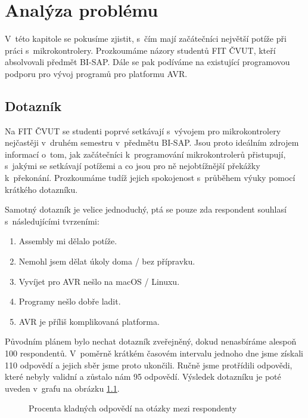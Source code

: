 \chapter{Analýza problému}

V~této kapitole se pokusíme zjistit, s~čím mají začátečníci největší potíže při práci s~mikrokontrolery. Prozkoumáme názory studentů FIT ČVUT, kteří absolvovali předmět BI-SAP. Dále se pak podíváme na existující programovou podporu pro vývoj programů pro platformu AVR.

\section{Dotazník}

Na FIT ČVUT se studenti poprvé setkávají s~vývojem pro mikrokontrolery nejčastěji v~druhém semestru v~předmětu BI-SAP. Jsou proto ideálním zdrojem informací o~tom, jak začátečníci k~programování mikrokontrolerů přistupují, s~jakými se setkávají potížemi a co jsou pro ně nejobtížnější pře\-káž\-ky k~překonání. Prozkoumáme tudíž jejich spokojenost s~průběhem výuky pomocí krátkého dotazníku.

Samotný dotazník je velice jednoduchý, ptá se pouze zda respondent souhlasí s~následujícími tvrzeními:

\begin{enumerate}
	\item Assembly mi dělalo potíže.
	\item Nemohl jsem dělat úkoly doma / bez přípravku.
	\item Vyvíjet pro AVR nešlo na macOS / Linuxu.
	\item Programy nešlo dobře ladit.
	\item AVR je příliš komplikovaná platforma.
\end{enumerate}

Původním plánem bylo nechat dotazník zveřejněný, dokud nenasbíráme alespoň 100 respondentů. V~poměrně krátkém časovém intervalu jednoho dne jsme získali 110 odpovědí a jejich sběr jsme proto ukončili. Ručně jsme protřídili odpovědi, které nebyly validní a zůstalo nám 95 odpovědí. Výsledek dotazníku je poté uveden v~grafu na obrázku \ref{fig:survey}.

\begin{figure}
\begin{center}
\caption{Procenta kladných odpovědí na otázky mezi respondenty}
\label{fig:survey}
\end{center}
\end{figure}

